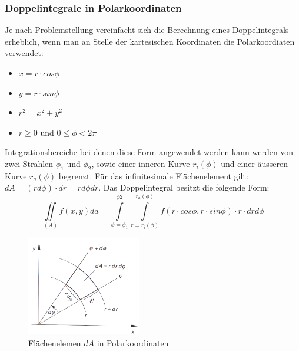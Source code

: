 \subsubsection{Doppelintegrale in Polarkoordinaten}
Je nach Problemstellung vereinfacht sich die Berechnung eines Doppelintegrals erheblich, wenn man an Stelle der kartesischen Koordinaten die Polarkoordiaten verwendet:
\begin{itemize}
\item $x = r \cdot cos\phi$
\item $y = r \cdot sin\phi$
\item $r^2 = x^2 + y^2$
\item $r \geq 0$ und $0 \leq \phi < 2\pi$
\end{itemize}
Integrationsbereiche bei denen diese Form angewendet werden kann werden von zwei Strahlen $\phi_1$ und $\phi_2$, sowie einer inneren Kurve $r_i(\phi)$ und einer äusseren Kurve $r_a(\phi)$ begrenzt. Für das infinitesimale Flächenelement gilt: $dA = (rd\phi) \cdot dr = rd\phi dr$. Das Doppelintegral besitzt die folgende Form:
$$\iint\limits_{(A)} f(x, y) da = \int\limits_{\phi = \phi_1}^{\phi2} \int\limits_{r = r_i(\phi)}^{r_a(\phi)} f(r\cdot cos\phi, r \cdot sin \phi) \cdot r \cdot dr d\phi$$
\begin{figure}[H]
\centering
	\includegraphics[width=5cm]{Bilder/dipolar_1}
	\caption{Flächenelemen $dA$ in Polarkoordinaten}
	\label{dipolar1}
\end{figure} 

